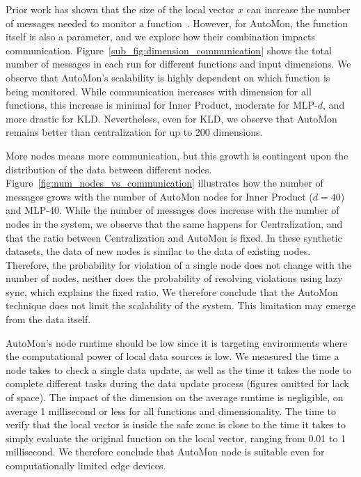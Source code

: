 Prior work has shown that the size of the local vector $x$ can increase the number of messages needed to monitor a function~\cite{gabel:monitoring_least_squares}.
However, for AutoMon, the function itself is also a parameter, and we explore how their combination impacts communication.
Figure~\ref{sub_fig:dimension_communication} shows the total number of messages in each run for different functions and input dimensions.
We observe that AutoMon's scalability is highly dependent on which function is being monitored.
While communication increases with dimension for all functions, this increase is minimal for Inner Product, moderate for MLP-$d$, and more drastic for KLD.
Nevertheless, even for KLD, we observe that AutoMon remains better than centralization for up to 200 dimensions.


More nodes means more communication, but this growth is contingent upon the distribution of the data between different nodes.
Figure~\ref{fig:num_nodes_vs_communication} illustrates how the number of messages grows with the number of AutoMon nodes for Inner Product ($d=40$) and MLP-40.
While the number of messages does increase with the number of nodes in the system, we observe that the same happens for Centralization, and that the ratio between Centralization and AutoMon is fixed.
In these synthetic datasets, the data of new nodes is similar to the data of existing nodes.
Therefore, the probability for violation of a single node does not change with the number of nodes, neither does the probability of resolving violations using lazy sync, which explains the fixed ratio.
We therefore conclude that the AutoMon technique does not limit the scalability of the system.
This limitation may emerge from the data itself.


AutoMon's node runtime should be low since it is targeting environments where the computational power of local data sources is low.
%
We measured the time a node takes to check a single data update, as well as the time it takes the node to complete different tasks during the data update process (figures omitted for lack of space).
The impact of the dimension on the average runtime is negligible, on average 1 millisecond or less for all functions and dimensionality.
The time to verify that the local vector is inside the safe zone is close to the time it takes to simply evaluate the original function on the local vector, ranging from 0.01 to 1 millisecond.
We therefore conclude that AutoMon node is suitable even for computationally limited edge devices.


